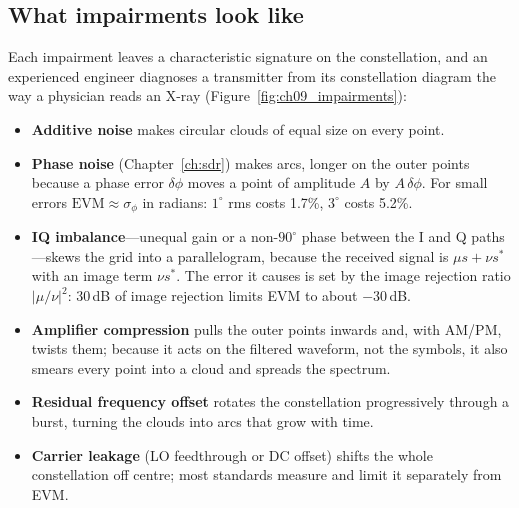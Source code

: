 
\subsection{What impairments look like}

Each impairment leaves a characteristic signature on the constellation, and an experienced
engineer diagnoses a transmitter from its constellation diagram the way a physician reads an
X-ray (Figure~\ref{fig:ch09_impairments}):
\begin{itemize}
\item \textbf{Additive noise} makes circular clouds of equal size on every point.
\item \textbf{Phase noise} (Chapter~\ref{ch:sdr}) makes arcs, longer on the outer points because a
phase error $\delta\phi$ moves a point of amplitude $A$ by $A\,\delta\phi$. For small errors
$\mathrm{EVM}\approx\sigma_\phi$ in radians: $1^\circ$ rms costs 1.7\%, $3^\circ$ costs 5.2\%.
\item \textbf{IQ imbalance}---unequal gain or a non-$90^\circ$ phase between the I and Q paths---skews
the grid into a parallelogram, because the received signal is $\mu s+\nu s^*$ with an image term
$\nu s^*$. The error it causes is set by the image rejection ratio $|\mu/\nu|^2$: 30\,dB of image
rejection limits EVM to about $-30$\,dB.
\item \textbf{Amplifier compression} pulls the outer points inwards and, with AM/PM, twists them;
because it acts on the filtered waveform, not the symbols, it also smears every point into a cloud
and spreads the spectrum.
\item \textbf{Residual frequency offset} rotates the constellation progressively through a burst,
turning the clouds into arcs that grow with time.
\item \textbf{Carrier leakage} (LO feedthrough or DC offset) shifts the whole constellation off
centre; most standards measure and limit it separately from EVM.
\end{itemize}


